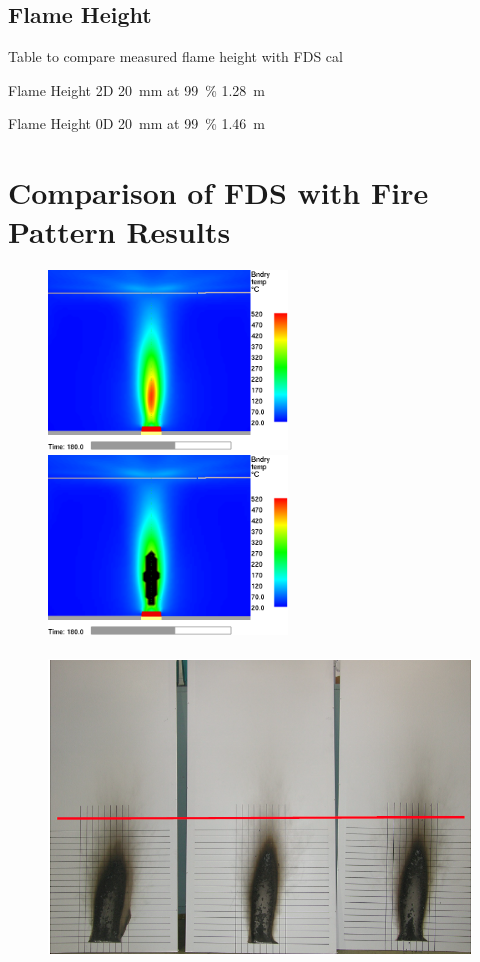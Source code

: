 \documentclass[twoside]{uocthesis}
\begin{document}
\subsection{Flame Height}

Table to compare measured flame height with FDS cal~\cite{McDermott:2011}



Flame Height 2D  20~mm  at 99~\%  1.28~m

Flame Height 0D  20~mm  at 99~\%  1.46~m




\section{Comparison of FDS with Fire Pattern Results}

\begin{figure}[h]
  \centering
  \includegraphics[width=2.5in]{../Figures/WallTemp_10mm_0D_0_8m_guideline}
  \includegraphics[width=2.5in]{../Figures/350CThresholdwall_temp_0_8m_guideline}\\
  \hspace{4 mm}  \\ 
  \includegraphics[width=.625\columnwidth]{../Figures/GBNGreps_w_1m_guideline}\\

\end{figure}
\end{document}
